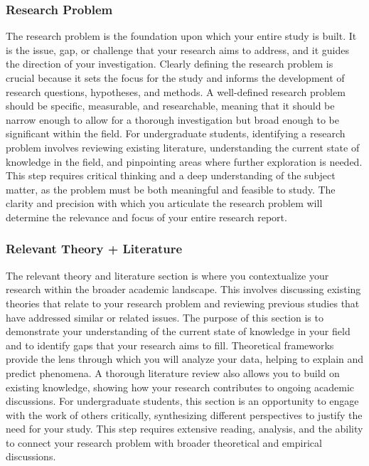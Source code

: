 \documentclass[
]{book}
\begin{document}
\subsubsection*{Research Problem}\label{research-problem}

The research problem is the foundation upon which your entire study is built. It is the issue, gap, or challenge that your research aims to address, and it guides the direction of your investigation. Clearly defining the research problem is crucial because it sets the focus for the study and informs the development of research questions, hypotheses, and methods. A well-defined research problem should be specific, measurable, and researchable, meaning that it should be narrow enough to allow for a thorough investigation but broad enough to be significant within the field. For undergraduate students, identifying a research problem involves reviewing existing literature, understanding the current state of knowledge in the field, and pinpointing areas where further exploration is needed. This step requires critical thinking and a deep understanding of the subject matter, as the problem must be both meaningful and feasible to study. The clarity and precision with which you articulate the research problem will determine the relevance and focus of your entire research report.

\subsubsection*{Relevant Theory + Literature}\label{relevant-theory-literature}

The relevant theory and literature section is where you contextualize your research within the broader academic landscape. This involves discussing existing theories that relate to your research problem and reviewing previous studies that have addressed similar or related issues. The purpose of this section is to demonstrate your understanding of the current state of knowledge in your field and to identify gaps that your research aims to fill. Theoretical frameworks provide the lens through which you will analyze your data, helping to explain and predict phenomena. A thorough literature review also allows you to build on existing knowledge, showing how your research contributes to ongoing academic discussions. For undergraduate students, this section is an opportunity to engage with the work of others critically, synthesizing different perspectives to justify the need for your study. This step requires extensive reading, analysis, and the ability to connect your research problem with broader theoretical and empirical discussions.
\end{document}
